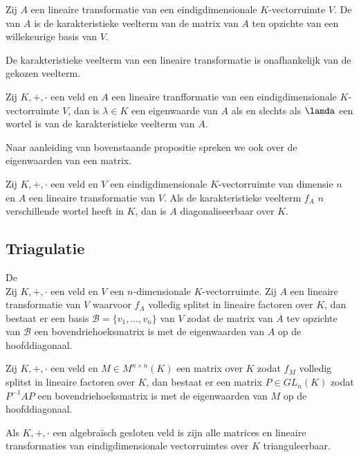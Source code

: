 \documentclass[main.tex]{subfiles}
\begin{document}
\begin{de}
  Zij $A$ een lineaire transformatie van een eindigdimensionale $K$-vectorruimte $V$.
  De  van $A$ is de karakteristieke veelterm van de matrix van $A$ ten opzichte van een willekeurige basis van $V$.
\end{de}

\begin{st}
  De karakteristieke veelterm van een lineaire transformatie is onafhankelijk van de gekozen veelterm.
\end{st}

\begin{pr}
  Zij $K,+,\cdot$ een veld en $A$ een lineaire tranfformatie van een eindigdimensionale $K$-vectorruimte $V$, dan is $\lambda\in K$ een eigenwaarde van $A$ als en slechts als $\lamda$ een wortel is van de karakteristieke veelterm van $A$.
\end{pr}

\begin{de}
  Naar aanleiding van bovenstaande propositie spreken we ook over de eigenwaarden van een matrix.
\end{de}

\begin{gev}
  Zij $K,+,\cdot$ een veld en $V$ een eindigdimensionale $K$-vectorruimte van dimensie $n$ en $A$ een lineaire transformatie van $V$.
  Als de karakteristieke veelterm $f_{A}$ $n$ verschillende wortel heeft in $K$, dan is $A$ diagonaliseerbaar over $K$.
\end{gev}

\subsection{Triagulatie}
\label{sec:triagulatie}

\begin{st}
  De \\
  Zij $K,+,\cdot$ een veld en $V$ een $n$-dimensionale $K$-vectorruimte.
  Zij $A$ een lineaire transformatie van $V$ waarvoor $f_{A}$ volledig splitst in lineaire factoren over $K$, dan bestaat er een basis $\mathcal{B} = \{ v_{1},\dotsc,v_{n} \}$ van $V$ zodat de matrix van $A$ tev opzichte van $\mathcal{B}$ een bovendriehoeksmatrix is met de eigenwaarden van $A$ op de hoofddiagonaal.
\end{st}

\begin{gev}
  Zij $K,+,\cdot$ een veld en $M\in M^{n\times n}(K)$ een matrix over $K$ zodat $f_{M}$ volledig splitst in lineaire factoren over $K$, dan bestaat er een matrix $P\in GL_{n}(K)$ zodat $P^{-1}AP$ een bovendriehoeksmatrix is met de eigenwaarden van $M$ op de hoofddiagonaal.
\end{gev}

\begin{opm}
  Als $K,+,\cdot$ een algebra\"isch gesloten veld is zijn alle matrices en lineaire transformaties van eindigdimensionale vectorruimtes over $K$ trianguleerbaar.
\end{opm}
\end{document}
